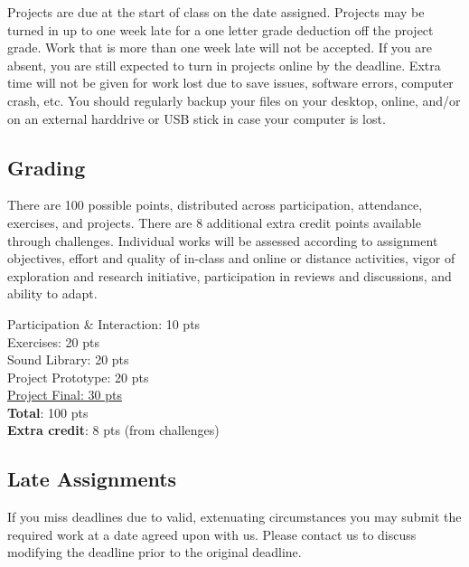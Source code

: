 Projects are due at the start of class on the date assigned. Projects may be turned in up to one week late for a one letter grade deduction off the project grade. Work that is more than one week late will not be accepted. If you are absent, you are still expected to turn in projects online by the deadline. Extra time will not be given for work lost due to save issues, software errors, computer crash, etc. You should regularly backup your files on your desktop, online, and/or on an external harddrive or USB stick in case your computer is lost.

\subsection{Grading}

There are 100 possible points, distributed across participation, attendance, exercises, and projects. There are 8 additional extra credit points available through challenges. Individual works will be assessed according to assignment objectives, effort and quality of in-class and online or distance activities, vigor of exploration and research initiative, participation in reviews and discussions, and ability to adapt.

\hspace*{1em} Participation \& Interaction: 10 pts\\
\hspace*{1em} Exercises: 20 pts\\
\hspace*{1em} Sound Library: 20 pts\\
\hspace*{1em} Project Prototype: 20 pts\\
\hspace*{1em} \ul{Project Final: 30 pts}\\
\hspace*{1em} \textbf{Total}: 100 pts\\
\hspace*{1em} \textbf{Extra credit}: 8 pts (from challenges)

\subsection{Late Assignments}

If you miss deadlines due to valid, extenuating circumstances you may submit the required work at a date agreed upon with us. Please contact us to discuss modifying the deadline prior to the original deadline.

